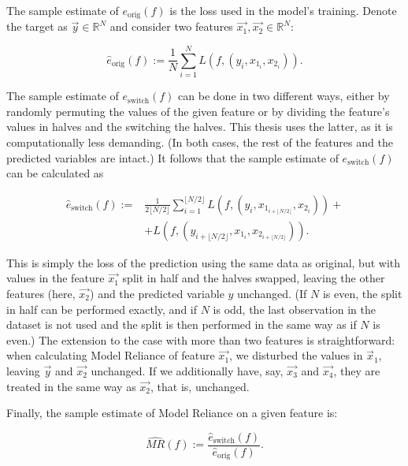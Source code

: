 			The sample estimate of $e_{\text{orig}}(f)$ is the loss used in the model's training. Denote the target as $\vec{y} \in \mathbb{R}^N$ and consider two features $\vec{x_1}, \vec{x_2} \in \mathbb{R}^{N}$:
			
			\begin{equation*}
				\hat{e}_{\text{orig}}(f):= \frac{1}{N} \sum_{i=1}^{N} L\left(f, (y_i, x_{1_i}, x_{2_i}) \right).
			\end{equation*} 
			
			The sample estimate of $e_{\text{switch}}(f)$ can be done in two different ways, either by randomly permuting the values of the given feature or by dividing the feature's values in halves and the switching the halves. This thesis uses the latter, as it is computationally less demanding. (In both cases, the rest of the features and the predicted variables are intact.) It follows that the sample estimate of $e_{\text{switch}}(f)$ can be calculated as
			
			
			\begin{equation*}
				\begin{split}
					\hat{e}_{\text{switch}}(f):= & \frac{1}{2 \lfloor N/2 \rfloor} \sum_{i=1}^{\lfloor N/2 \rfloor} L \left(f, \left( y_i, x_{1_{i+\lfloor N/2 \rfloor}}, x_{2_{i}} \right) \right) + \\ 
					& + L \left( f, \left(y_{i+\lfloor N/2 \rfloor}, x_{1_{i}}, x_{2_{i+\lfloor N/2 \rfloor}} \right) \right). 
				\end{split}
			\end{equation*}
			
			This is simply the loss of the prediction using the same data as original, but with values in the feature $\vec{x_1}$ split in half and the halves swapped, leaving the other features (here, $\vec{x_2}$) and the predicted variable $y$ unchanged. (If $N$ is even, the split in half can be performed exactly, and if $N$ is odd, the last observation in the dataset is not used and the split is then performed in the same way as if $N$ is even.) The extension to the case with more than two features is straightforward: when calculating Model Reliance of feature $\vec{x_1}$, we disturbed the values in $\vec{x}_1$, leaving $\vec{y}$ and $\vec{x_2}$ unchanged. If we additionally have, say, $\vec{x_3}$ and $\vec{x_4}$, they are treated in the same way as $\vec{x_2}$, that is, unchanged. 
			
			Finally, the sample estimate of Model Reliance on a given feature is: 
			
			\begin{equation*}
				\widehat{MR}(f):=\frac{\hat{e}_{\text{switch}}(f)}{\hat{e}_{\text{orig}}(f)}.
			\end{equation*}
				
